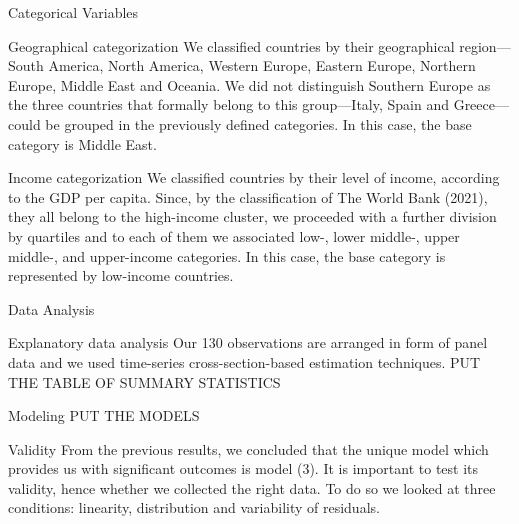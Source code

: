 \documentclass[
  ignorenonframetext,
]{beamer}
\begin{document}
\begin{frame}{Categorical Variables}
\protect\hypertarget{categorical-variables}{}
\begin{block}{Geographical categorization}
\protect\hypertarget{geographical-categorization}{}
We classified countries by their geographical region---South America,
North America, Western Europe, Eastern Europe, Northern Europe, Middle
East and Oceania. We did not distinguish Southern Europe as the three
countries that formally belong to this group---Italy, Spain and
Greece---could be grouped in the previously defined categories. In this
case, the base category is Middle East.
\end{block}

\begin{block}{Income categorization}
\protect\hypertarget{income-categorization}{}
We classified countries by their level of income, according to the GDP
per capita. Since, by the classification of The World Bank (2021), they
all belong to the high-income cluster, we proceeded with a further
division by quartiles and to each of them we associated low-, lower
middle-, upper middle-, and upper-income categories. In this case, the
base category is represented by low-income countries.
\end{block}
\end{frame}

\begin{frame}{Data Analysis}
\protect\hypertarget{data-analysis}{}
\begin{block}{Explanatory data analysis}
\protect\hypertarget{explanatory-data-analysis}{}
Our 130 observations are arranged in form of panel data and we used
time-series cross-section-based estimation techniques. PUT THE TABLE OF
SUMMARY STATISTICS
\end{block}
\end{frame}

\begin{frame}{Modeling}
\protect\hypertarget{modeling}{}
PUT THE MODELS
\end{frame}

\begin{frame}{Validity}
\protect\hypertarget{validity}{}
From the previous results, we concluded that the unique model which
provides us with significant outcomes is model (3). It is important to
test its validity, hence whether we collected the right data. To do so
we looked at three conditions: linearity, distribution and variability
of residuals.
\end{frame}
\end{document}
